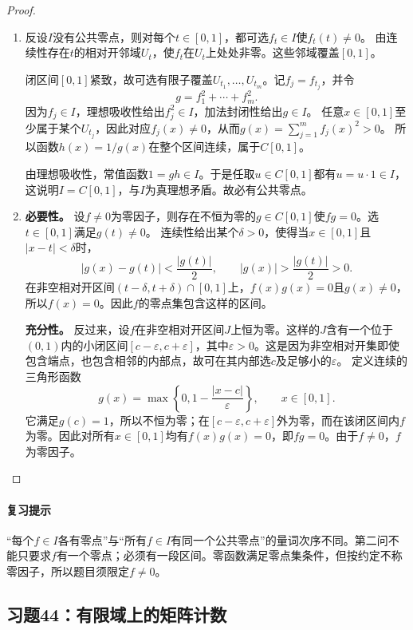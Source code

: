 \begin{proof}
\begin{enumerate}\item
反设$I$没有公共零点，则对每个$t\in[0,1]$，都可选$f_t\in I$使$f_t(t)\ne0$。
由连续性存在$t$的相对开邻域$U_t$，使$f_t$在$U_t$上处处非零。这些邻域覆盖$[0,1]$。

闭区间$[0,1]$紧致，故可选有限子覆盖$U_{t_1},\ldots,U_{t_m}$。记$f_j=f_{t_j}$，并令
\[
g=f_1^2+\cdots+f_m^2.
\]
因为$f_j\in I$，理想吸收性给出$f_j^2\in I$，加法封闭性给出$g\in I$。
任意$x\in[0,1]$至少属于某个$U_{t_j}$，因此对应$f_j(x)\ne0$，从而$g(x)=\sum_{j=1}^m f_j(x)^2>0$。
所以函数$h(x)=1/g(x)$在整个区间连续，属于$C[0,1]$。

由理想吸收性，常值函数$1=gh\in I$。于是任取$u\in C[0,1]$都有$u=u\cdot1\in I$，这说明$I=C[0,1]$，与$I$为真理想矛盾。故必有公共零点。

\item\textbf{必要性。}
设$f\ne0$为零因子，则存在不恒为零的$g\in C[0,1]$使$fg=0$。选$t\in[0,1]$满足$g(t)\ne0$。
连续性给出某个$\delta>0$，使得当$x\in[0,1]$且$|x-t|<\delta$时，
\[
|g(x)-g(t)|<\frac{|g(t)|}{2},\qquad
|g(x)|>\frac{|g(t)|}{2}>0.
\]
在非空相对开区间$(t-\delta,t+\delta)\cap[0,1]$上，$f(x)g(x)=0$且$g(x)\ne0$，所以$f(x)=0$。因此$f$的零点集包含这样的区间。

\textbf{充分性。}
反过来，设$f$在非空相对开区间$J$上恒为零。这样的$J$含有一个位于$(0,1)$内的小闭区间$[c-\varepsilon,c+\varepsilon]$，其中$\varepsilon>0$。这是因为非空相对开集即使包含端点，也包含相邻的内部点，故可在其内部选$c$及足够小的$\varepsilon$。
定义连续的三角形函数
\[
g(x)=\max\left\{0,1-\frac{|x-c|}{\varepsilon}\right\},\qquad x\in[0,1].
\]
它满足$g(c)=1$，所以不恒为零；在$[c-\varepsilon,c+\varepsilon]$外为零，而在该闭区间内$f$为零。因此对所有$x\in[0,1]$均有$f(x)g(x)=0$，即$fg=0$。由于$f\ne0$，$f$为零因子。
\end{enumerate}
\end{proof}

\paragraph{复习提示}
“每个$f\in I$各有零点”与“所有$f\in I$有同一个公共零点”的量词次序不同。第二问不能只要求$f$有一个零点；必须有一段区间。零函数满足零点集条件，但按约定不称零因子，所以题目须限定$f\ne0$。


\subsection{习题44：\texorpdfstring{有限域上的矩阵计数}{有限域上的矩阵计数}}
\label{ex:1:44}

